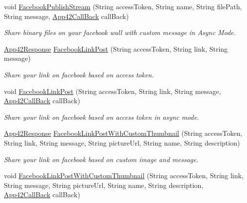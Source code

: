 \begin{DoxyCompactItemize}
void \hyperlink{classcom_1_1shephertz_1_1app42_1_1paas_1_1sdk_1_1csharp_1_1social_1_1_social_service_a551879fe0e380b97a0a9f4bdfd6a5ffc}{Facebook\+Publish\+Stream} (String access\+Token, String name, String file\+Path, String message, \hyperlink{interfacecom_1_1shephertz_1_1app42_1_1paas_1_1sdk_1_1csharp_1_1_app42_call_back}{App42\+Call\+Back} call\+Back)
\begin{DoxyCompactList}\small\item\em Share binary files on your facebook wall with custom message in Async Mode. \end{DoxyCompactList}\item 
\hyperlink{classcom_1_1shephertz_1_1app42_1_1paas_1_1sdk_1_1csharp_1_1_app42_response}{App42\+Response} \hyperlink{classcom_1_1shephertz_1_1app42_1_1paas_1_1sdk_1_1csharp_1_1social_1_1_social_service_ab3a01b337ff7301de88e2856ca7c3d21}{Facebook\+Link\+Post} (String access\+Token, String link, String message)
\begin{DoxyCompactList}\small\item\em Share your link on facebook based on access token. \end{DoxyCompactList}\item 
void \hyperlink{classcom_1_1shephertz_1_1app42_1_1paas_1_1sdk_1_1csharp_1_1social_1_1_social_service_af1dd8fa331b9b7f7ec6cc5207ba9e622}{Facebook\+Link\+Post} (String access\+Token, String link, String message, \hyperlink{interfacecom_1_1shephertz_1_1app42_1_1paas_1_1sdk_1_1csharp_1_1_app42_call_back}{App42\+Call\+Back} call\+Back)
\begin{DoxyCompactList}\small\item\em Share your link on facebook based on access token in async mode. \end{DoxyCompactList}\item 
\hyperlink{classcom_1_1shephertz_1_1app42_1_1paas_1_1sdk_1_1csharp_1_1_app42_response}{App42\+Response} \hyperlink{classcom_1_1shephertz_1_1app42_1_1paas_1_1sdk_1_1csharp_1_1social_1_1_social_service_afeec1b28e9433d89dc5ab21c8301b8e4}{Facebook\+Link\+Post\+With\+Custom\+Thumbnail} (String access\+Token, String link, String message, String picture\+Url, String name, String description)
\begin{DoxyCompactList}\small\item\em Share your link on facebook based on custom image and message. \end{DoxyCompactList}\item 
void \hyperlink{classcom_1_1shephertz_1_1app42_1_1paas_1_1sdk_1_1csharp_1_1social_1_1_social_service_af23e62811f636259c11a735458eae62e}{Facebook\+Link\+Post\+With\+Custom\+Thumbnail} (String access\+Token, String link, String message, String picture\+Url, String name, String description, \hyperlink{interfacecom_1_1shephertz_1_1app42_1_1paas_1_1sdk_1_1csharp_1_1_app42_call_back}{App42\+Call\+Back} call\+Back)

\end{DoxyCompactItemize}
